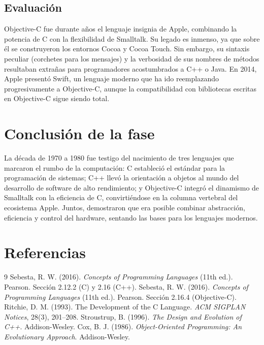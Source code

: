 \subsection{Evaluación}

Objective-C fue durante años el lenguaje insignia de Apple, combinando la potencia de C con la flexibilidad de Smalltalk. Su legado es inmenso, ya que sobre él se construyeron los entornos Cocoa y Cocoa Touch. Sin embargo, su sintaxis peculiar (corchetes para los mensajes) y la verbosidad de sus nombres de métodos resultaban extrañas para programadores acostumbrados a C++ o Java. En 2014, Apple presentó Swift, un lenguaje moderno que ha ido reemplazando progresivamente a Objective-C, aunque la compatibilidad con bibliotecas escritas en Objective-C sigue siendo total.

\section{Conclusión de la fase}

La década de 1970 a 1980 fue testigo del nacimiento de tres lenguajes que marcaron el rumbo de la computación: C estableció el estándar para la programación de sistemas; C++ llevó la orientación a objetos al mundo del desarrollo de software de alto rendimiento; y Objective-C integró el dinamismo de Smalltalk con la eficiencia de C, convirtiéndose en la columna vertebral del ecosistema Apple. Juntos, demostraron que era posible combinar abstracción, eficiencia y control del hardware, sentando las bases para los lenguajes modernos.

\section*{Referencias}

\begin{thebibliography}{9}
 Sebesta, R. W. (2016). \textit{Concepts of Programming Languages} (11th ed.). Pearson. Sección 2.12.2 (C) y 2.16 (C++).
 Sebesta, R. W. (2016). \textit{Concepts of Programming Languages} (11th ed.). Pearson. Sección 2.16.4 (Objective-C).
 Ritchie, D. M. (1993). The Development of the C Language. \textit{ACM SIGPLAN Notices}, 28(3), 201–208.
 Stroustrup, B. (1996). \textit{The Design and Evolution of C++}. Addison-Wesley.
 Cox, B. J. (1986). \textit{Object-Oriented Programming: An Evolutionary Approach}. Addison-Wesley.
\end{thebibliography}